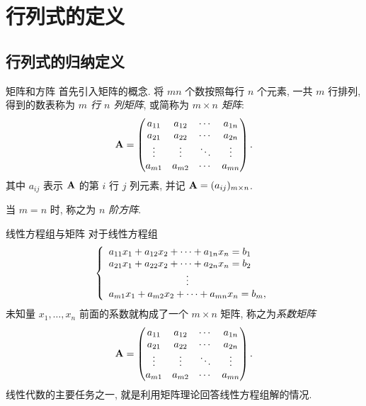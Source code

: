 \section{行列式的定义}

\subsection{行列式的归纳定义}
\begin{frame}{矩阵和方阵}
	\onslide<+->
	首先引入矩阵的概念.
	\onslide<+->
	将 $mn$ 个数按照每行 $n$ 个元素, 一共 $m$ 行排列, 得到的数表称为 \emph{$m$ 行 $n$ 列矩阵}, 或简称为 \emph{$m\times n$ 矩阵}:
	\[{\mathbf{A}}=\begin{pmatrix}
		a_{11}&a_{12}&\cdots &a_{1n}\\
		a_{21}&a_{22}&\cdots &a_{2n}\\
		\vdots&\vdots&\ddots&\vdots\\
		a_{m1}&a_{m2}&\cdots &a_{mn}
	\end{pmatrix}.\]
	\onslide<+->
	其中 $a_{ij}$ 表示 ${\mathbf{A}}$ 的第 $i$ 行 $j$ 列元素, 并记 ${\mathbf{A}}=(a_{ij})_{m\times n}$.

	\onslide<+->
	当 $m=n$ 时, 称之为 \emph{$n$ 阶方阵}.
\end{frame}


\begin{frame}{线性方程组与矩阵}
	\onslide<+->
	对于线性方程组
	\[\laeq{
		a_{11}x_1+a_{12}x_2+\cdots+a_{1n}x_n=b_1\\
		a_{21}x_1+a_{22}x_2+\cdots+a_{2n}x_n=b_2\\
		\vvdots\\
		a_{m1}x_1+a_{m2}x_2+\cdots+a_{mn}x_n=b_m,
	}\]
	未知量 $x_1,\dots,x_n$ 前面的系数就构成了一个 $m\times n$ 矩阵, 称之为\emph{系数矩阵}
	\[{\mathbf{A}}=\begin{pmatrix}
		a_{11}&a_{12}&\cdots &a_{1n}\\
		a_{21}&a_{22}&\cdots &a_{2n}\\
		\vdots&\vdots&\ddots&\vdots\\
		a_{m1}&a_{m2}&\cdots &a_{mn}
	\end{pmatrix}.\]
	\onslide<+->
	线性代数的主要任务之一, 就是利用矩阵理论回答线性方程组解的情况.
\end{frame}


